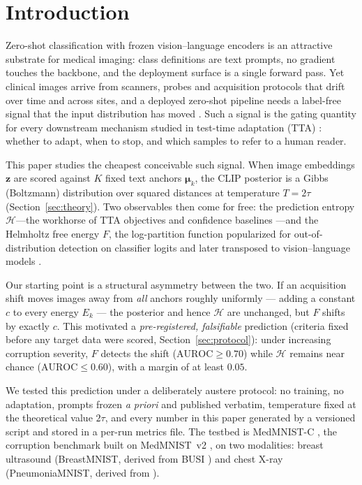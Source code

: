 \documentclass[11pt]{article}
\newcommand{\bz}{\mathbf{z}}
\newcommand{\bmu}{\boldsymbol{\mu}}
\newcommand{\Hent}{\mathcal{H}}
\begin{document}
\section{Introduction}
\label{sec:intro}

Zero-shot classification with frozen vision--language encoders
\citep{radford2021clip} is an attractive substrate for medical imaging:
class definitions are text prompts, no gradient touches the backbone, and the
deployment surface is a single forward pass. Yet clinical images arrive from
scanners, probes and acquisition protocols that drift over time and across
sites, and a deployed zero-shot pipeline needs a label-free signal that the
input distribution has moved \citep{rabanser2019failing}. Such a signal is the
gating quantity for every downstream mechanism studied in test-time adaptation
(TTA) \citep{wang2021tent,shu2022tpt,yoon2024ctpt,niu2022eata,niu2023sar}:
whether to adapt, when to stop, and which samples to refer to a human reader.

This paper studies the cheapest conceivable such signal. When image embeddings
$\bz$ are scored against $K$ fixed text anchors $\bmu_k$, the CLIP posterior is
a Gibbs (Boltzmann) distribution over squared distances at temperature
$T=2\tau$ (Section~\ref{sec:theory}). Two observables then come for free: the
prediction entropy $\Hent$---the workhorse of TTA objectives and confidence
baselines \citep{hendrycks2017msp,wang2021tent}---and the Helmholtz free
energy $F$, the log-partition function popularized for out-of-distribution
detection on classifier logits \citep{liu2020energy,grathwohl2020jem,lecun2006ebm}
and later transposed to vision--language models \citep{ming2022delving}.

Our starting point is a structural asymmetry between the two. If an
acquisition shift moves images away from \emph{all} anchors roughly uniformly
--- adding a constant $c$ to every energy $E_k$ --- the posterior and hence
$\Hent$ are unchanged, but $F$ shifts by exactly $c$. This motivated a
\emph{pre-registered, falsifiable} prediction (criteria fixed before any
target data were scored, Section~\ref{sec:protocol}): under increasing
corruption severity, $F$ detects the shift
($\mathrm{AUROC}\ge 0.70$) while $\Hent$ remains near chance
($\mathrm{AUROC}\le 0.60$), with a margin of at least $0.05$.

We tested this prediction under a deliberately austere protocol: no training,
no adaptation, prompts frozen \emph{a priori} and published verbatim,
temperature fixed at the theoretical value $2\tau$, and every number in this
paper generated by a versioned script and stored in a per-run metrics file.
The testbed is MedMNIST-C \citep{disalvo2025medmnistc}, the corruption
benchmark built on MedMNIST~v2 \citep{yang2023medmnist}, on two modalities:
breast ultrasound (BreastMNIST, derived from BUSI
\citep{aldhabyani2020busi}) and chest X-ray (PneumoniaMNIST, derived from
\citealp{kermany2018pneumonia}).
\end{document}
